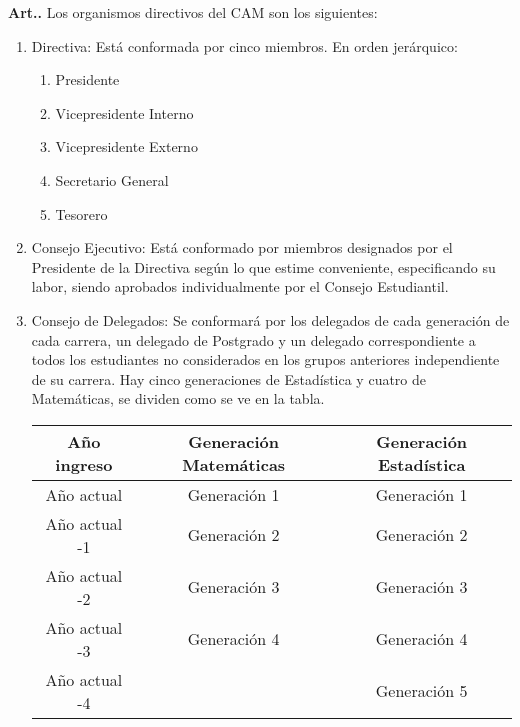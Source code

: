 \documentclass[letterpaper,11pt]{article}
\newcounter{art}
\newenvironment{art}{\refstepcounter{art}\textbf{Art.{\space}\theart.}}{}
\begin{document}
\begin{art}\label{definicionesOrganismos}
    Los organismos directivos del CAM son los siguientes:
    \begin{enumerate}
        \item Directiva: Está conformada por cinco miembros. En orden jerárquico:
              \begin{enumerate}
                  \item Presidente
                  \item Vicepresidente Interno
                  \item Vicepresidente Externo
                  \item Secretario General
                  \item Tesorero
              \end{enumerate}
        \item Consejo Ejecutivo: Está conformado por miembros designados por el Presidente de la Directiva según lo que estime conveniente, especificando su labor, siendo aprobados individualmente por el Consejo Estudiantil.
        \item Consejo de Delegados: Se conformará por los delegados de cada generación de cada carrera, un delegado de Postgrado y un delegado correspondiente a todos los estudiantes no considerados en los grupos anteriores independiente de su carrera. Hay cinco generaciones de Estadística y cuatro de Matemáticas, se dividen como se ve en la tabla.
              \begin{center}
                  \begin{tabular}{|c|c|c|}
                      \hline
                      Año ingreso   & Generación Matemáticas & Generación Estadística \\
                      \hline
                      Año actual    & Generación 1           & Generación 1           \\
                      Año actual -1 & Generación 2           & Generación 2           \\
                      Año actual -2 & Generación 3           & Generación 3           \\
                      Año actual -3 & Generación 4           & Generación 4           \\
                      Año actual -4 &                        & Generación 5           \\
                      \hline
                  \end{tabular}

\end{center}
\end{enumerate}
\end{art}
\end{document}
